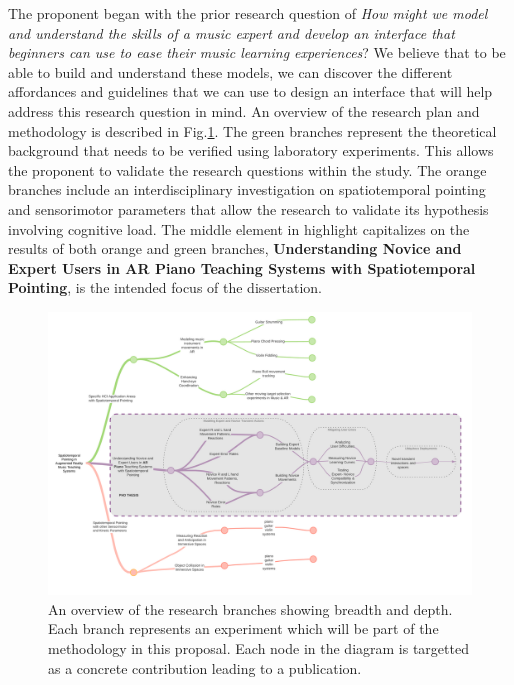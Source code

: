 \documentclass{article}
\begin{document}
The proponent began with the prior research question of \textit{How might we model and understand the skills of a music expert and develop an interface that beginners can use to ease their music learning experiences}? We believe that to be able to build and understand these models, we can discover the different affordances and guidelines that we can use to design an interface that will help address this research question in mind. An overview of the research plan and methodology is described in Fig.\ref{fig:branches}. The green branches represent the theoretical background that needs to be verified using laboratory experiments. This allows the proponent to validate the research questions within the study.  The orange branches include an interdisciplinary investigation on spatiotemporal pointing and sensorimotor parameters that allow the research to validate its hypothesis involving cognitive load. The middle element in highlight capitalizes on the results of both orange and green branches, \textbf{Understanding Novice and Expert Users in AR Piano Teaching Systems with Spatiotemporal Pointing}, is the intended focus of the dissertation. 

\begin{landscape}
\begin{figure}[h]
\centering
 \includegraphics[width=\columnwidth\textheight]{figures/branches.png}
    \caption{An overview of the research branches showing breadth and depth. Each branch represents an experiment which will be part of the methodology in this proposal. Each node in the diagram is targetted  as a concrete contribution leading to a publication.
 }\label{fig:branches}
\end{figure}
\end{landscape}
\end{document}
